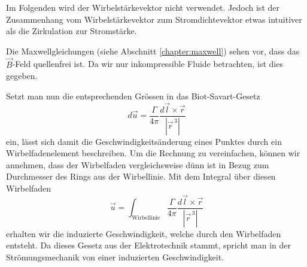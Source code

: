 Im Folgenden wird der Wirbelstärkevektor nicht verwendet.
Jedoch ist der Zusammenhang vom Wirbelstärkevektor zum Stromdichtevektor etwas intuitiver als die Zirkulation zur Stromstärke.

Die Maxwellgleichungen (siehe Abschnitt \ref{chapter:maxwell}) sehen vor, dass das \(\vec{B}\)-Feld quellenfrei ist. 
Da wir nur inkompressible Fluide betrachten, ist dies gegeben.

Setzt man nun die entsprechenden Grössen in das Biot-Savart-Gesetz
\[
d\vec{u}
=
\frac{\Gamma}{4\pi}\frac{d\vec{l} \times \vec{r}}{\left\lvert \vec{r}^{\,3}\right\rvert }
\]
ein, lässt sich damit die Geschwindigkeitsänderung eines Punktes durch ein Wirbelfadenelement beschreiben.
Um die Rechnung zu vereinfachen, können wir annehmen, dass der Wirbelfaden vergleichsweise dünn ist in Bezug zum Durchmesser des Rings aus der Wirbellinie.
Mit dem Integral über diesen Wirbelfaden
\begin{equation}
    \label{Wirbelringe:eq:WirbelSpeed}
    \vec{u}
    =
    \int_{\text{Wirbellinie}} \frac{\Gamma}{4\pi}\frac{d\vec{l} \times \vec{r}}{\left\lvert \vec{r}^{\,3}\right\rvert}
\end{equation}
erhalten wir die induzierte Geschwindigkeit, welche durch den Wirbelfaden entsteht.
Da dieses Gesetz aus der Elektrotechnik stammt, spricht man in der Strömungsmechanik von einer induzierten Geschwindigkeit.

